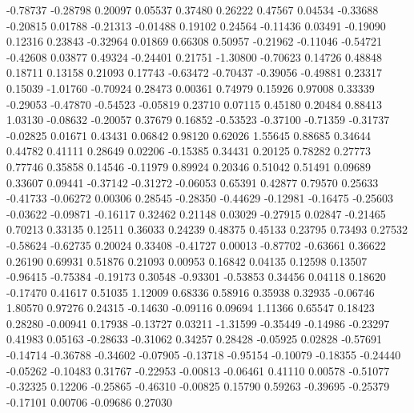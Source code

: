   -0.78737 -0.28798
   0.20097  0.05537
   0.37480  0.26222
   0.47567  0.04534
  -0.33688 -0.20815
   0.01788 -0.21313
  -0.01488  0.19102
   0.24564 -0.11436
   0.03491 -0.19090
   0.12316  0.23843
  -0.32964  0.01869
   0.66308  0.50957
  -0.21962 -0.11046
  -0.54721 -0.42608
   0.03877  0.49324
  -0.24401  0.21751
  -1.30800 -0.70623
   0.14726  0.48848
   0.18711  0.13158
   0.21093  0.17743
  -0.63472 -0.70437
  -0.39056 -0.49881
   0.23317  0.15039
  -1.01760 -0.70924
   0.28473  0.00361
   0.74979  0.15926
   0.97008  0.33339
  -0.29053 -0.47870
  -0.54523 -0.05819
   0.23710  0.07115
   0.45180  0.20484
   0.88413  1.03130
  -0.08632 -0.20057
   0.37679  0.16852
  -0.53523 -0.37100
  -0.71359 -0.31737
  -0.02825  0.01671
   0.43431  0.06842
   0.98120  0.62026
   1.55645  0.88685
   0.34644  0.44782
   0.41111  0.28649
   0.02206 -0.15385
   0.34431  0.20125
   0.78282  0.27773
   0.77746  0.35858
   0.14546 -0.11979
   0.89924  0.20346
   0.51042  0.51491
   0.09689  0.33607
   0.09441 -0.37142
  -0.31272 -0.06053
   0.65391  0.42877
   0.79570  0.25633
  -0.41733 -0.06272
   0.00306  0.28545
  -0.28350 -0.44629
  -0.12981 -0.16475
  -0.25603 -0.03622
  -0.09871 -0.16117
   0.32462  0.21148
   0.03029 -0.27915
   0.02847 -0.21465
   0.70213  0.33135
   0.12511  0.36033
   0.24239  0.48375
   0.45133  0.23795
   0.73493  0.27532
  -0.58624 -0.62735
   0.20024  0.33408
  -0.41727  0.00013
  -0.87702 -0.63661
   0.36622  0.26190
   0.69931  0.51876
   0.21093  0.00953
   0.16842  0.04135
   0.12598  0.13507
  -0.96415 -0.75384
  -0.19173  0.30548
  -0.93301 -0.53853
   0.34456  0.04118
   0.18620 -0.17470
   0.41617  0.51035
   1.12009  0.68336
   0.58916  0.35938
   0.32935 -0.06746
   1.80570  0.97276
   0.24315 -0.14630
  -0.09116  0.09694
   1.11366  0.65547
   0.18423  0.28280
  -0.00941  0.17938
  -0.13727  0.03211
  -1.31599 -0.35449
  -0.14986 -0.23297
   0.41983  0.05163
  -0.28633 -0.31062
   0.34257  0.28428
  -0.05925  0.02828
  -0.57691 -0.14714
  -0.36788 -0.34602
  -0.07905 -0.13718
  -0.95154 -0.10079
  -0.18355 -0.24440
  -0.05262 -0.10483
   0.31767 -0.22953
  -0.00813 -0.06461
   0.41110  0.00578
  -0.51077 -0.32325
   0.12206 -0.25865
  -0.46310 -0.00825
   0.15790  0.59263
  -0.39695 -0.25379
  -0.17101  0.00706
  -0.09686  0.27030

